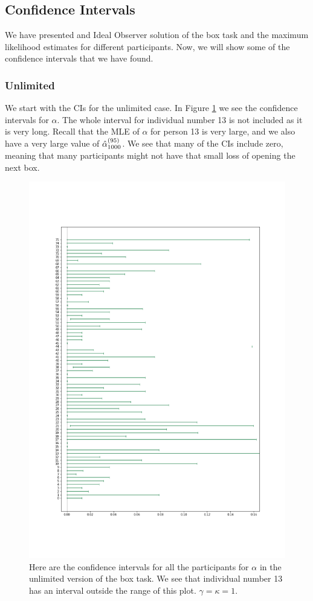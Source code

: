 \subsection{Confidence Intervals}
We have presented and Ideal Observer solution of the box task and the maximum likelihood estimates for different participants. Now, we will show some of the confidence intervals that we have found. 

\subsubsection{Unlimited}
We start with the CIs for the unlimited case. In Figure \ref{fig:all_cis_alpha_unlim_v2} we see the confidence intervals for $\alpha$. The whole interval for individual number 13 is not included as it is very long. Recall that the MLE of $\alpha$ for person 13 is very large, and we also have a very large value of $\hat{\alpha}_{1000}^{(95)}$. We see that many of the CIs include zero, meaning that many participants might not have that small loss of opening the next box. 
\begin{figure}
    \centering
    \includegraphics[scale=0.37]{pictures/all_cis_unlim_alpha.png}
    \caption[CIs for $\alpha$, unlimited. $\gamma=\kappa=1$]{Here are the confidence intervals for all the participants for $\alpha$ in the unlimited version of the box task. We see that individual number 13 has an interval outside the range of this plot. $\gamma=\kappa=1$.}
    \label{fig:all_cis_alpha_unlim_v2}
\end{figure}
